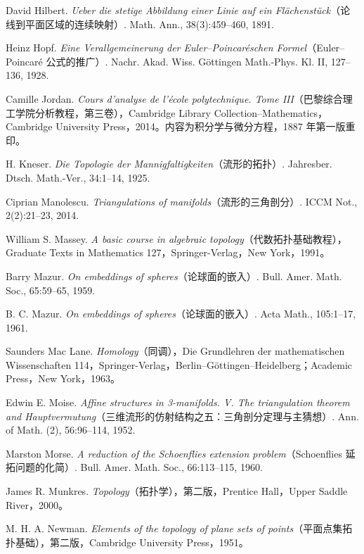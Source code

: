 \begin{description}[style=nextline]
\item[{[Hil91]}] David Hilbert. \textit{Ueber die stetige Abbildung einer Linie auf ein Flächenstück}（论线到平面区域的连续映射）. Math. Ann., 38(3):459--460, 1891.
\item[{[Hop28]}] Heinz Hopf. \textit{Eine Verallgemeinerung der Euler--Poincaréschen Formel}（Euler--Poincaré 公式的推广）. Nachr. Akad. Wiss. Göttingen Math.-Phys. Kl. II, 127--136, 1928.
\item[{[Jor14]}] Camille Jordan. \textit{Cours d'analyse de l'école polytechnique. Tome III}（巴黎综合理工学院分析教程，第三卷），Cambridge Library Collection--Mathematics，Cambridge University Press，2014。内容为积分学与微分方程，1887 年第一版重印。
\item[{[Kne25]}] H. Kneser. \textit{Die Topologie der Mannigfaltigkeiten}（流形的拓扑）. Jahresber. Dtsch. Math.-Ver., 34:1--14, 1925.
\item[{[Man14]}] Ciprian Manolescu. \textit{Triangulations of manifolds}（流形的三角剖分）. ICCM Not., 2(2):21--23, 2014.
\item[{[Mas91]}] William S. Massey. \textit{A basic course in algebraic topology}（代数拓扑基础教程），Graduate Texts in Mathematics 127，Springer-Verlag，New York，1991。
\item[{[Maz59]}] Barry Mazur. \textit{On embeddings of spheres}（论球面的嵌入）. Bull. Amer. Math. Soc., 65:59--65, 1959.
\item[{[Maz61]}] B. C. Mazur. \textit{On embeddings of spheres}（论球面的嵌入）. Acta Math., 105:1--17, 1961.
\item[{[ML63]}] Saunders Mac Lane. \textit{Homology}（同调），Die Grundlehren der mathematischen Wissenschaften 114，Springer-Verlag，Berlin--Göttingen--Heidelberg；Academic Press，New York，1963。
\item[{[Moi52]}] Edwin E. Moise. \textit{Affine structures in 3-manifolds. V. The triangulation theorem and Hauptvermutung}（三维流形的仿射结构之五：三角剖分定理与主猜想）. Ann. of Math. (2), 56:96--114, 1952.
\item[{[Mor60]}] Marston Morse. \textit{A reduction of the Schoenflies extension problem}（Schoenflies 延拓问题的化简）. Bull. Amer. Math. Soc., 66:113--115, 1960.
\item[{[Mun00]}] James R. Munkres. \textit{Topology}（拓扑学），第二版，Prentice Hall，Upper Saddle River，2000。
\item[{[New51]}] M. H. A. Newman. \textit{Elements of the topology of plane sets of points}（平面点集拓扑基础），第二版，Cambridge University Press，1951。

\end{description}
